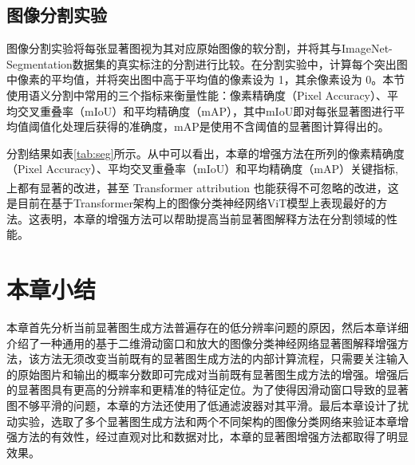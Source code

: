 \subsection{图像分割实验}
图像分割实验将每张显著图视为其对应原始图像的软分割，并将其与ImageNet-Segmentation数据集的真实标注的分割进行比较。在分割实验中，计算每个突出图中像素的平均值，并将突出图中高于平均值的像素设为 1，其余像素设为 0。本节使用语义分割中常用的三个指标来衡量性能：像素精确度（Pixel Accuracy）、平均交叉重叠率（mIoU）和平均精确度（mAP），其中mIoU即对每张显著图进行平均值阈值化处理后获得的准确度，mAP是使用不含阈值的显著图计算得出的。


分割结果如表\ref{tab:seg}所示。从中可以看出，本章的增强方法在所列的像素精确度（Pixel Accuracy）、平均交叉重叠率（mIoU）和平均精确度（mAP）关键指标,上都有显著的改进，甚至 Transformer attribution\textsuperscript{\cite{chefer2021transformer}} 也能获得不可忽略的改进，这是目前在基于Transformer架构上的图像分类神经网络ViT模型上表现最好的方法。这表明，本章的增强方法可以帮助提高当前显著图解释方法在分割领域的性能。

	
\section{本章小结}\label{4:5}
本章首先分析当前显著图生成方法普遍存在的低分辨率问题的原因，然后本章详细介绍了一种通用的基于二维滑动窗口和放大的图像分类神经网络显著图解释增强方法，该方法无须改变当前既有的显著图生成方法的内部计算流程，只需要关注输入的原始图片和输出的概率分数即可完成对当前既有显著图生成方法的增强。增强后的显著图具有更高的分辨率和更精准的特征定位。为了使得因滑动窗口导致的显著图不够平滑的问题，本章的方法还使用了低通滤波器对其平滑。最后本章设计了扰动实验，选取了多个显著图生成方法和两个不同架构的图像分类网络来验证本章增强方法的有效性，经过直观对比和数据对比，本章的显著图增强方法都取得了明显效果。 


